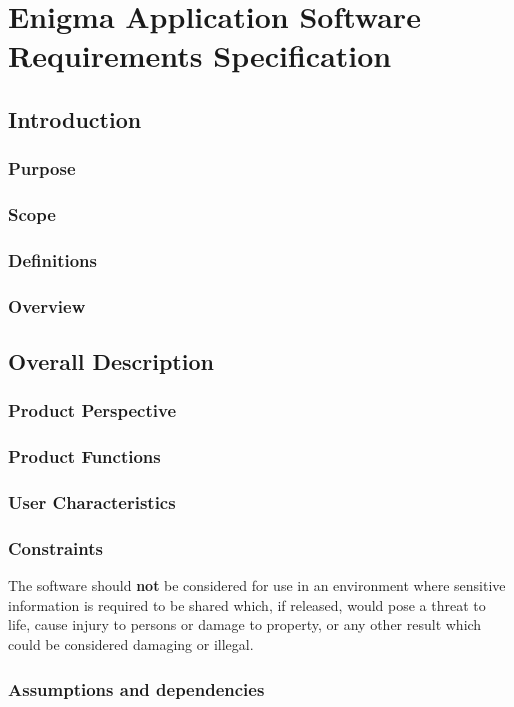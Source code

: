 
\chapter{Enigma Application Software Requirements Specification}
\label{AppendixA}

\section{Introduction}

\subsection{Purpose}

\subsection{Scope}



\subsection{Definitions}

\subsection{Overview}

\section{Overall Description}

\subsection{Product Perspective}

\subsection{Product Functions}

\subsection{User Characteristics}

\subsection{Constraints}

The software should \textbf{not} be considered for use in an environment where sensitive information is required to be shared which, if released, would pose a threat to life, cause injury to persons or damage to property, or any other result which could be considered damaging or illegal.

\subsection{Assumptions and dependencies}